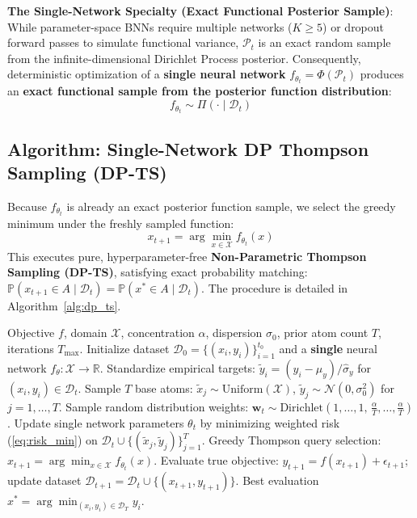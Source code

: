 \documentclass{article}
\begin{document}
\textbf{The Single-Network Specialty (Exact Functional Posterior Sample)}: While parameter-space BNNs require multiple networks ($K \ge 5$) or dropout forward passes to simulate functional variance, $\mathcal{P}_t$ is an exact random sample from the infinite-dimensional Dirichlet Process posterior. Consequently, deterministic optimization of a \textbf{single neural network} $f_{\theta_t} = \Phi(\mathcal{P}_t)$ produces an \textbf{exact functional sample from the posterior function distribution}:
\begin{equation}
f_{\theta_t} \sim \Pi(\cdot \mid \mathcal{D}_t)
\end{equation}

\subsection{Algorithm: Single-Network DP Thompson Sampling (DP-TS)}
Because $f_{\theta_t}$ is already an exact posterior function sample, we select the greedy minimum under the freshly sampled function:
\begin{equation}
\label{eq:greedy_action}
x_{t+1} = \arg\min_{x \in \mathcal{X}} f_{\theta_t}(x)
\end{equation}
This executes pure, hyperparameter-free \textbf{Non-Parametric Thompson Sampling (DP-TS)}, satisfying exact probability matching: $\mathbb{P}(x_{t+1} \in A \mid \mathcal{D}_t) = \mathbb{P}(x^* \in A \mid \mathcal{D}_t)$. The procedure is detailed in Algorithm~\ref{alg:dp_ts}.

\begin{algorithm}[t]
\caption{Single-Network DP Thompson Sampling (DP-TS)}
\label{alg:dp_ts}
\begin{algorithmic}[1]
\REQUIRE Objective $f$, domain $\mathcal{X}$, concentration $\alpha$, dispersion $\sigma_0$, prior atom count $T$, iterations $T_{\mathrm{max}}$.
\STATE Initialize dataset $\mathcal{D}_0 = \{(x_i, y_i)\}_{i=1}^{t_0}$ and a \textbf{single} neural network $f_\theta: \mathcal{X} \to \mathbb{R}$.
    \STATE Standardize empirical targets: $\tilde{y}_i = (y_i - \hat{\mu}_y) / \hat{\sigma}_y$ for $(x_i, y_i) \in \mathcal{D}_t$.
    \STATE Sample $T$ base atoms: $\tilde{x}_j \sim \mathrm{Uniform}(\mathcal{X})$, $\tilde{y}_j \sim \mathcal{N}(0, \sigma_0^2)$ for $j = 1, \dots, T$.
    \STATE Sample random distribution weights: $\mathbf{w}_t \sim \mathrm{Dirichlet}\left(1, \dots, 1, \, \frac{\alpha}{T}, \dots, \frac{\alpha}{T}\right)$.
    \STATE Update single network parameters $\theta_t$ by minimizing weighted risk (\ref{eq:risk_min}) on $\mathcal{D}_t \cup \{(\tilde{x}_j, \tilde{y}_j)\}_{j=1}^T$.
    \STATE Greedy Thompson query selection: $x_{t+1} = \arg\min_{x \in \mathcal{X}} f_{\theta_t}(x)$.
    \STATE Evaluate true objective: $y_{t+1} = f(x_{t+1}) + \epsilon_{t+1}$; update dataset $\mathcal{D}_{t+1} = \mathcal{D}_t \cup \{(x_{t+1}, y_{t+1})\}$.
\ENDFOR
\ENSURE Best evaluation $x^* = \arg\min_{(x_i, y_i) \in \mathcal{D}_T} y_i$.
\end{algorithmic}
\end{algorithm}
\end{document}
